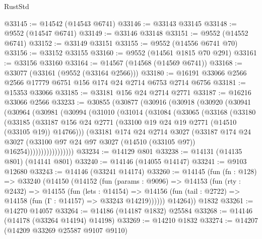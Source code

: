 \begin{lexlean}{RustStd}
\begin{coremodule}
@33145 := @14542 (@14543 @6741)
@33146 := @33143 @33145
@33148 := @9552 (@14547 @6741)
@33149 := @33146 @33148
@33151 := @9552 (@14552 @6741)
@33152 := @33149 @33151
@33155 := @9552 (@14556 @6741 @70)
@33156 := @33152 @33155
@33160 := @9552 (@14561 @1815 @70 @291)
@33161 := @33156 @33160
@33164 := @14567 (@14568 (@14569 @6741))
@33168 := @33077 (@33161 (@9552 (@33164 @2566)))
@33180 := @16191 @33066 @2566 @2566 @17779 @6751 @156 @174 @24 @2714 @6753 @2714 @6756
@33181 := @15353 @33066
@33185 := @33181 @156 @24 @2714 @2771
@33187 := @16216 @33066 @2566
@33233 := @30855
    (@30877
      (@30916
        (@30918
          (@30920
            (@30941
              (@30964
                (@30981
                  (@30994
                    (@31010
                      (@31014
                        (@31084
                          (@33065
                            (@33168
                              (@33180
                                (@33185
                                  (@33187
                                    @156
                                    @24
                                    @2771
                                    (@33100 @19 @24 @19 @2771 (@14510 (@33105 @19)) @14766)))
                                (@33181
                                  @174
                                  @24
                                  @2714
                                  @3027
                                  (@33187
                                    @174
                                    @24
                                    @3027
                                    (@33100
                                      @97
                                      @24
                                      @97
                                      @3027
                                      (@14510 (@33105 @97))
                                      @16254)))))))))))))))))
@33234 := @14129 @801
@33238 := @14131 (@14135 @801) (@14141 @801)
@33240 := @14146 (@14055 @14147)
@33241 := @9103 @12680
@33243 := @14146 (@33241 @14174)
@33260 := @14145
    (fun (fn : @128) =>
    @33240
      (@14150
        (@14152
          (fun (params : @9096) =>
          @14153
            (fun (rty : @2432) =>
            @14155
              (fun (lets : @14154) =>
              @14156 (fun (tail : @2722) => @14158 (fun (Γ : @14157) => @33243 @14219))))))
        @14264))
    @1832
@33261 := @14270 @14057
@33264 := @14186 (@14187 @1832) @25584
@33268 := @14146 (@14178 (@33264 @14194) @14198)
@33269 := @14210 @1832
@33274 := @14207 (@14209 @33269 @25587 @9107 @9110)

\end{coremodule}
\end{lexlean}
